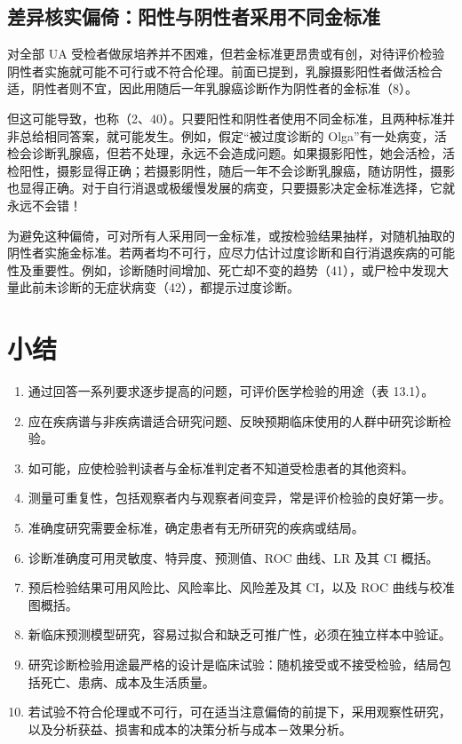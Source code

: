\subsection{差异核实偏倚：阳性与阴性者采用不同金标准}
对全部 UA 受检者做尿培养并不困难，但若金标准更昂贵或有创，对待评价检验阴性者实施就可能不可行或不符合伦理。前面已提到，乳腺摄影阳性者做活检合适，阴性者则不宜，因此用随后一年乳腺癌诊断作为阴性者的金标准（8）。

但这可能导致，也称（2、40）。只要阳性和阴性者使用不同金标准，且两种标准并非总给相同答案，就可能发生。例如，假定“被过度诊断的 Olga”有一处病变，活检会诊断乳腺癌，但若不处理，永远不会造成问题。如果摄影阳性，她会活检，活检阳性，摄影显得正确；若摄影阴性，随后一年不会诊断乳腺癌，随访阴性，摄影也显得正确。对于自行消退或极缓慢发展的病变，只要摄影决定金标准选择，它就永远不会错！

为避免这种偏倚，可对所有人采用同一金标准，或按检验结果抽样，对随机抽取的阴性者实施金标准。若两者均不可行，应尽力估计过度诊断和自行消退疾病的可能性及重要性。例如，诊断随时间增加、死亡却不变的趋势（41），或尸检中发现大量此前未诊断的无症状病变（42），都提示过度诊断。

\section{小结}
\begin{enumerate}
\item 通过回答一系列要求逐步提高的问题，可评价医学检验的用途（表 13.1）。
\item 应在疾病谱与非疾病谱适合研究问题、反映预期临床使用的人群中研究诊断检验。
\item 如可能，应使检验判读者与金标准判定者不知道受检患者的其他资料。
\item 测量可重复性，包括观察者内与观察者间变异，常是评价检验的良好第一步。
\item 准确度研究需要金标准，确定患者有无所研究的疾病或结局。
\item 诊断准确度可用灵敏度、特异度、预测值、ROC 曲线、LR 及其 CI 概括。
\item 预后检验结果可用风险比、风险率比、风险差及其 CI，以及 ROC 曲线与校准图概括。
\item 新临床预测模型研究，容易过拟合和缺乏可推广性，必须在独立样本中验证。
\item 研究诊断检验用途最严格的设计是临床试验：随机接受或不接受检验，结局包括死亡、患病、成本及生活质量。
\item 若试验不符合伦理或不可行，可在适当注意偏倚的前提下，采用观察性研究，以及分析获益、损害和成本的决策分析与成本－效果分析。
\end{enumerate}

